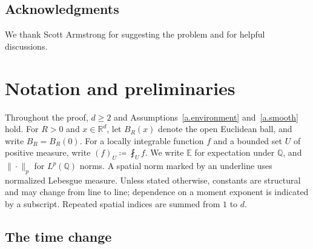 \documentclass[11pt]{amsart}
\theoremstyle{definition}
\theoremstyle{remark}
\numberwithin{equation}{section}
\newcommand{\E}{\mathbb E}
\newcommand{\Q}{\mathbb Q}
\newcommand{\R}{\mathbb R}
\begin{document}
\subsection*{Acknowledgments}
We thank Scott Armstrong for suggesting the problem and for helpful discussions.


\section{Notation and preliminaries}\label{sec.notation}

Throughout the proof, $d\geq2$ and Assumptions~\ref{a.environment} and~\ref{a.smooth} hold. For $R>0$ and $x\in\R^d$, let $B_R(x)$ denote the open Euclidean ball, and write $B_R=B_R(0)$. For a locally integrable function $f$ and a bounded set $U$ of positive measure, write $(f)_U\coloneqq\fint_Uf$. We write $\E$ for expectation under $\Q$, and $\|\cdot\|_p$ for $L^p(\Q)$ norms. A spatial norm marked by an underline uses normalized Lebesgue measure. Unless stated otherwise, constants are structural and may change from line to line; dependence on a moment exponent is indicated by a subscript. Repeated spatial indices are summed from $1$ to $d$.

\subsection{The time change}\label{ss.time-change}
\end{document}
